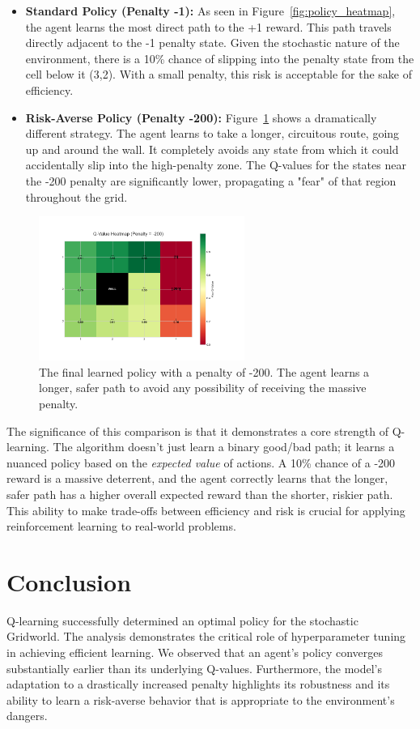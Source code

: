 \documentclass{article}
\begin{document}
\begin{itemize}
    \item \textbf{Standard Policy (Penalty -1):} As seen in Figure~\ref{fig:policy_heatmap}, the agent learns the most direct path to the +1 reward. This path travels directly adjacent to the -1 penalty state. Given the stochastic nature of the environment, there is a 10\% chance of slipping into the penalty state from the cell below it (3,2). With a small penalty, this risk is acceptable for the sake of efficiency.
    \item \textbf{Risk-Averse Policy (Penalty -200):} Figure~\ref{fig:policy_heatmap_penalty} shows a dramatically different strategy. The agent learns to take a longer, circuitous route, going up and around the wall. It completely avoids any state from which it could accidentally slip into the high-penalty zone. The Q-values for the states near the -200 penalty are significantly lower, propagating a "fear" of that region throughout the grid.
\end{itemize}

\begin{figure}[H]
    \centering
    \includegraphics[width=0.6\textwidth]{../results/qvalue_heatmap_with_higher_punishment.png}
    \caption{The final learned policy with a penalty of -200. The agent learns a longer, safer path to avoid any possibility of receiving the massive penalty.}
    \label{fig:policy_heatmap_penalty}
\end{figure}

The significance of this comparison is that it demonstrates a core strength of Q-learning. The algorithm doesn't just learn a binary good/bad path; it learns a nuanced policy based on the \textit{expected value} of actions. A 10\% chance of a -200 reward is a massive deterrent, and the agent correctly learns that the longer, safer path has a higher overall expected reward than the shorter, riskier path. This ability to make trade-offs between efficiency and risk is crucial for applying reinforcement learning to real-world problems.

\section{Conclusion}
Q-learning successfully determined an optimal policy for the stochastic Gridworld. The analysis demonstrates the critical role of hyperparameter tuning in achieving efficient learning. We observed that an agent's policy converges substantially earlier than its underlying Q-values. Furthermore, the model's adaptation to a drastically increased penalty highlights its robustness and its ability to learn a risk-averse behavior that is appropriate to the environment's dangers.
\end{document}
